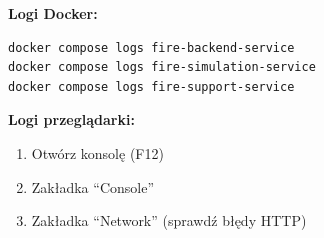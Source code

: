 \documentclass[11pt,a4paper]{article}
\begin{document}
\textbf{Logi Docker:}
\begin{lstlisting}[language=bash, basicstyle=\small]
docker compose logs fire-backend-service
docker compose logs fire-simulation-service
docker compose logs fire-support-service
\end{lstlisting}

\textbf{Logi przeglądarki:}
\begin{enumerate}
    \item Otwórz konsolę (F12)
    \item Zakładka ``Console''
    \item Zakładka ``Network'' (sprawdź błędy HTTP)
\end{enumerate}
\end{document}

